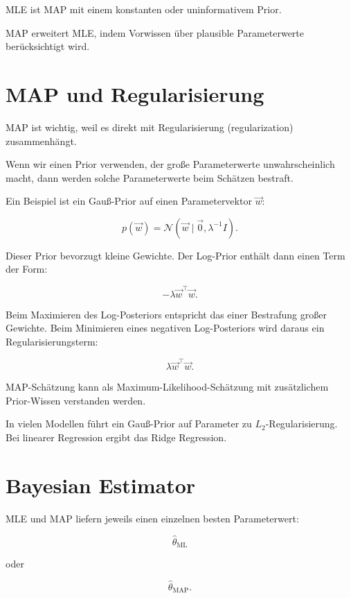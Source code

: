 \begin{conceptbox}
MLE ist MAP mit einem konstanten oder uninformativem Prior.

MAP erweitert MLE, indem Vorwissen über plausible Parameterwerte berücksichtigt wird.
\end{conceptbox}

\section{MAP und Regularisierung}

MAP ist wichtig, weil es direkt mit Regularisierung (regularization) zusammenhängt.

Wenn wir einen Prior verwenden, der große Parameterwerte unwahrscheinlich macht, dann werden solche Parameterwerte beim Schätzen bestraft.

Ein Beispiel ist ein Gauß-Prior auf einen Parametervektor \(\vec{w}\):

\[
    p(\vec{w})
    =
    \mathcal{N}
    \left(
        \vec{w}
        \mid
        \vec{0},
        \lambda^{-1}I
    \right).
\]

Dieser Prior bevorzugt kleine Gewichte.
Der Log-Prior enthält dann einen Term der Form:

\[
    -\lambda \vec{w}^{\top}\vec{w}.
\]

Beim Maximieren des Log-Posteriors entspricht das einer Bestrafung großer Gewichte.
Beim Minimieren eines negativen Log-Posteriors wird daraus ein Regularisierungsterm:

\[
    \lambda \vec{w}^{\top}\vec{w}.
\]

\begin{conceptbox}
MAP-Schätzung kann als Maximum-Likelihood-Schätzung mit zusätzlichem Prior-Wissen verstanden werden.

In vielen Modellen führt ein Gauß-Prior auf Parameter zu \(L_2\)-Regularisierung.
Bei linearer Regression ergibt das Ridge Regression.
\end{conceptbox}

\section{Bayesian Estimator}

MLE und MAP liefern jeweils einen einzelnen besten Parameterwert:

\[
    \hat{\theta}_{\mathrm{ML}}
\]

oder

\[
    \hat{\theta}_{\mathrm{MAP}}.
\]

